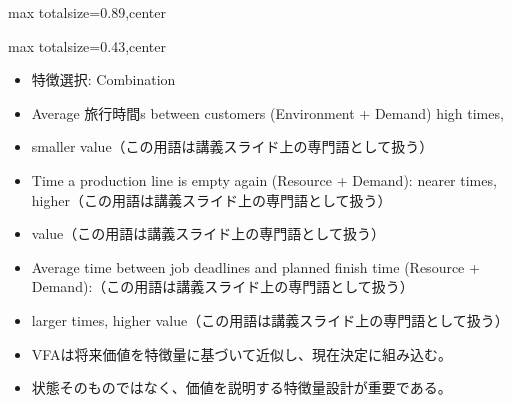 \begin{minipage}[t]{0.58\textwidth}
\begin{adjustbox}{max totalsize={\textwidth}{0.89\textheight},center}
\begin{minipage}{\textwidth}
\end{minipage}
\end{adjustbox}
\end{minipage}


\clearpage
{}
\begin{minipage}[t]{0.405\textwidth}
\begin{adjustbox}{max totalsize={\textwidth}{0.43\textheight},center}
\begin{minipage}{\textwidth}\scriptsize
{}\begin{itemize}
\item 特徴選択: Combination
\item Average 旅行時間s between customers (Environment + Demand) high times,
\item smaller value（この用語は講義スライド上の専門語として扱う）
\item Time a production line is empty again (Resource + Demand): nearer times, higher（この用語は講義スライド上の専門語として扱う）
\item value（この用語は講義スライド上の専門語として扱う）
\item Average time between job deadlines and planned finish time (Resource + Demand):（この用語は講義スライド上の専門語として扱う）
\item larger times, higher value（この用語は講義スライド上の専門語として扱う）
\end{itemize}\begin{itemize}
\item VFAは将来価値を特徴量に基づいて近似し、現在決定に組み込む。
\item 状態そのものではなく、価値を説明する特徴量設計が重要である。
\end{itemize}
\end{minipage}
\end{adjustbox}
\end{minipage}\hfill
